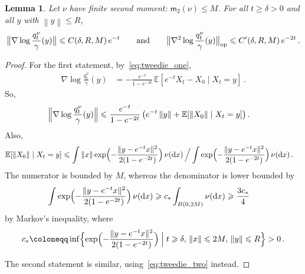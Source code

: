 \documentclass[12pt]{article}
\newcommand{\E}{\mathbb{E}}
\newcommand{\1}{\mathds{1}}
\newcommand*{\rd}{\mathrm{d}}
\newcommand*{\dd}{\, \rd}
\newcommand{\deq}{\coloneqq}
\newcommand*{\norm}[1]{\left\|#1\right\|}
\renewcommand{\ge}{\geqslant}
\renewcommand{\le}{\leqslant}
\newcommand{\mom}{\mathsf m_2}
\theoremstyle{plain}
\newtheorem{lemma}[theorem]{Lemma}
\theoremstyle{definition}
\theoremstyle{remark}
\begin{document}
\begin{lemma}\label{lem:technical_estimates}
    Let $\nu$ have finite second moment: $\mom(\nu) \le M$. For all $t\ge \delta > 0$ and all $y$ with $\norm y \le R$,
        \begin{align*}
            \bigl\lVert \nabla \log \frac{q_t^\nu}{\gamma}(y)\bigr\rVert \le C(\delta,R,M)\,e^{-t} \qquad\text{and}\qquad
            \bigl\lVert \nabla^2 \log \frac{q_t^\nu}{\gamma}(y)\bigr\rVert_{\rm op} \le C'(\delta,R,M)\,e^{-2t}\,.
        \end{align*}
\end{lemma}
\begin{proof}
    For the first statement, by~\eqref{eq:tweedie_one},
    \begin{align*}
        \nabla \log \frac{q_t^\nu}{\gamma}(y)
        &= -\frac{e^{-t}}{1-e^{-2t}}\, \E[e^{-t} X_t - X_0 \mid X_t = y]\,.
    \end{align*}
    So,
    \begin{align*}
        \Bigl\lVert \nabla \log \frac{q_t^\nu}{\gamma}(y)\Bigr\rVert
        &\le \frac{e^{-t}}{1-e^{-2t}}\,\bigl(e^{-t}\,\|y\| + \E[\|X_0\| \mid X_t=y]\bigr)\,.
    \end{align*}
    Also,
    \begin{align*}
        \E[\|X_0\| \mid X_t=y]
        &\le \int \|x\|\exp\Bigl(-\frac{\|y-e^{-t}x\|^2}{2(1-e^{-{2}t})}\Bigr)\,\nu(\!\dd x) \mathop{\Big/} \int \exp\Bigl(-\frac{\|y-e^{-t} x\|^2}{2(1-e^{-{2}t})}\Bigr)\,\nu(\!\dd x)\,.
    \end{align*}
    The numerator is bounded by $M$, whereas the denominator is lower bounded by
    \begin{align*}
        \int \exp\Bigl(-\frac{\|y-e^{-t} x\|^2}{2(1-e^{-{2}t})}\Bigr)\,\nu(\!\dd x)
        &\ge c_* \int_{B(0,2M)} \nu(\!\dd x)
        \ge \frac{3c_*}{4}
    \end{align*}
    by Markov's inequality, where
    \begin{align*}
        c_* \deq \inf\Bigl\{\exp\Bigl(-\frac{\|y-e^{-t} x\|^2}{2(1-e^{-{2}t})}\Bigr) \Bigm\vert t \ge \delta,\, \|x\| \le 2M,\, \|y\| \le R \Bigr\} > 0\,.
    \end{align*}

    The second statement is similar, using~\eqref{eq:tweedie_two} instead.
\end{proof}
\end{document}
